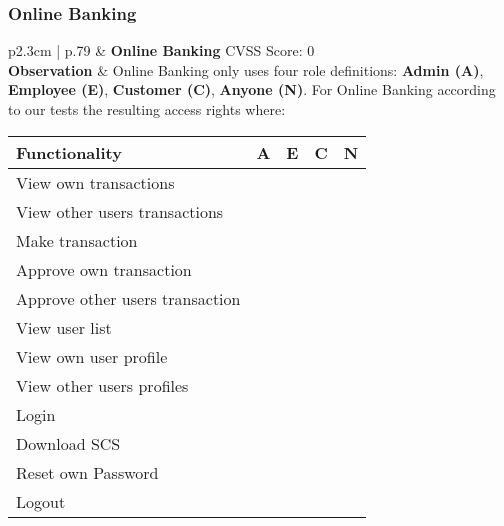 \clearpage
\subsubsection{Online Banking}
\begin{longtable}[l]{ p{2.3cm} | p{.79\linewidth} }\hline
    & \textbf{Online Banking}
    \hfill CVSS Score: 0 
    \\ \hline
    \textbf{Observation} &
        Online Banking only uses four role definitions: \textbf{Admin (A)}, \textbf{Employee (E)}, \textbf{Customer (C)}, \textbf{Anyone (N)}.
        For Online Banking according to our tests the resulting access rights where:
        \begin{center}
            \begin{tabular}{ | l | l | l | l |}
            \hline
            \textbf{Functionality}          & \textbf{A} & \textbf{E} & \textbf{C} & \textbf{N} \\ \hline
            View own transactions           & \xmark    & \xmark    & \cmark    & \xmark \\ \hline
            View other users transactions   & \cmark    & \cmark    & \xmark    & \xmark \\ \hline
            Make transaction                & \xmark    & \xmark    & \cmark    & \xmark \\ \hline
            Approve own transaction         & \xmark    & \xmark    & \xmark    & \xmark \\ \hline
            Approve other users transaction & \cmark    & \cmark    & \xmark    & \xmark \\ \hline
            View user list                  & \cmark    & \cmark    & \xmark    & \xmark \\ \hline
            View own user profile           & \cmark    & \cmark    & \cmark    & \xmark \\ \hline
            View other users profiles       & \cmark    & \cmark    & \xmark    & \xmark \\ \hline
            Login                           & \cmark    & \cmark    & \cmark    & \xmark \\ \hline
            Download SCS                    & \cmark    & \cmark    & \cmark    & \xmark \\ \hline
            Reset own Password              & \cmark    & \cmark    & \cmark    & \xmark \\ \hline
            Logout                          & \cmark    & \cmark    & \cmark    & \xmark \\ \hline

\end{tabular}
\end{center}
\end{longtable}
